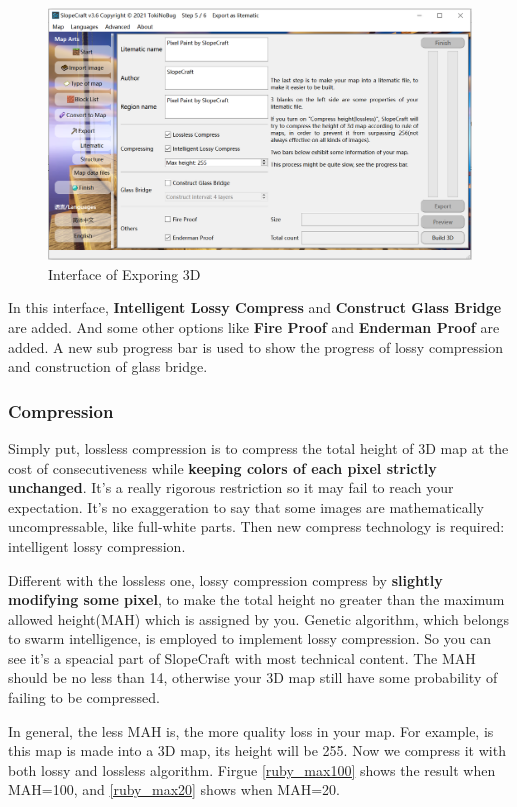 \documentclass{article}
\begin{document}
    \begin{figure}[htbp]
        \centering
        \includegraphics[width=15cm]{Img2_Export3D.png}
        \caption{Interface of Exporing 3D}
    \end{figure}

    In this interface, \textbf{Intelligent Lossy Compress} and \textbf{Construct Glass Bridge} are added. And some other options like \textbf{Fire Proof} and \textbf{Enderman Proof} are added. A new sub progress bar is used to show the progress of lossy compression and construction of glass bridge.
        
    \subsubsection{Compression}
    Simply put, lossless compression is to compress the total height of 3D map at the cost of consecutiveness while \textbf{keeping colors of each pixel strictly unchanged}. It's a really rigorous restriction so it may fail to reach your expectation. It's no exaggeration to say that some images are mathematically uncompressable, like full-white parts. Then new compress technology is required: intelligent lossy compression.

    Different with the lossless one, lossy compression compress by \textbf{slightly modifying some pixel}, to make the total height no greater than the maximum allowed height(MAH) which is assigned by you. Genetic algorithm, which belongs to swarm intelligence, is employed to implement lossy compression. So you can see it's a speacial part of SlopeCraft with most technical content. The MAH should be no less than 14, otherwise your 3D map still have some probability of failing to be compressed.

    In general, the less MAH is, the more quality loss in your map. For example, is this map is made into a 3D map, its height will be 255. Now we compress it with both lossy and lossless algorithm. Firgue \ref*{ruby_max100} shows the result when MAH=100, and \ref*{ruby_max20} shows when MAH=20.
\end{document}
